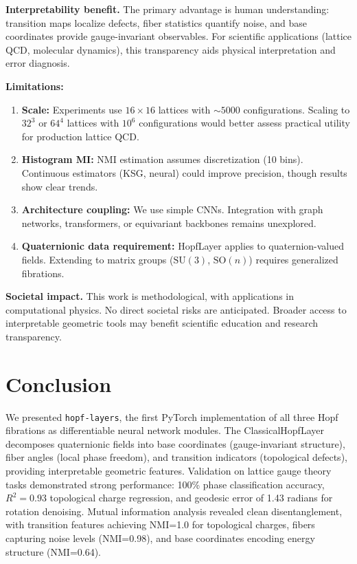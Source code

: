 \documentclass[10pt,twocolumn]{article}
\newcommand{\SU}{\mathrm{SU}}
\newcommand{\SO}{\mathrm{SO}}
\begin{document}
\textbf{Interpretability benefit.} The primary advantage is human understanding: transition maps localize defects, fiber statistics quantify noise, and base coordinates provide gauge-invariant observables. For scientific applications (lattice QCD, molecular dynamics), this transparency aids physical interpretation and error diagnosis.

\textbf{Limitations:}
\begin{enumerate}
\item \textbf{Scale:} Experiments use $16 \times 16$ lattices with ${\sim}5000$ configurations. Scaling to $32^3$ or $64^4$ lattices with $10^6$ configurations would better assess practical utility for production lattice QCD.
\item \textbf{Histogram MI:} NMI estimation assumes discretization (10 bins). Continuous estimators (KSG, neural) could improve precision, though results show clear trends.
\item \textbf{Architecture coupling:} We use simple CNNs. Integration with graph networks, transformers, or equivariant backbones remains unexplored.
\item \textbf{Quaternionic data requirement:} HopfLayer applies to quaternion-valued fields. Extending to matrix groups ($\SU(3)$, $\SO(n)$) requires generalized fibrations.
\end{enumerate}

\textbf{Societal impact.} This work is methodological, with applications in computational physics. No direct societal risks are anticipated. Broader access to interpretable geometric tools may benefit scientific education and research transparency.

\FloatBarrier
\section{Conclusion}

We presented \texttt{hopf-layers}, the first PyTorch implementation of all three Hopf fibrations as differentiable neural network modules. The ClassicalHopfLayer decomposes quaternionic fields into base coordinates (gauge-invariant structure), fiber angles (local phase freedom), and transition indicators (topological defects), providing interpretable geometric features. Validation on lattice gauge theory tasks demonstrated strong performance: 100\% phase classification accuracy, $R^2=0.93$ topological charge regression, and geodesic error of 1.43 radians for rotation denoising. Mutual information analysis revealed clean disentanglement, with transition features achieving NMI=1.0 for topological charges, fibers capturing noise levels (NMI=0.98), and base coordinates encoding energy structure (NMI=0.64).
\end{document}
